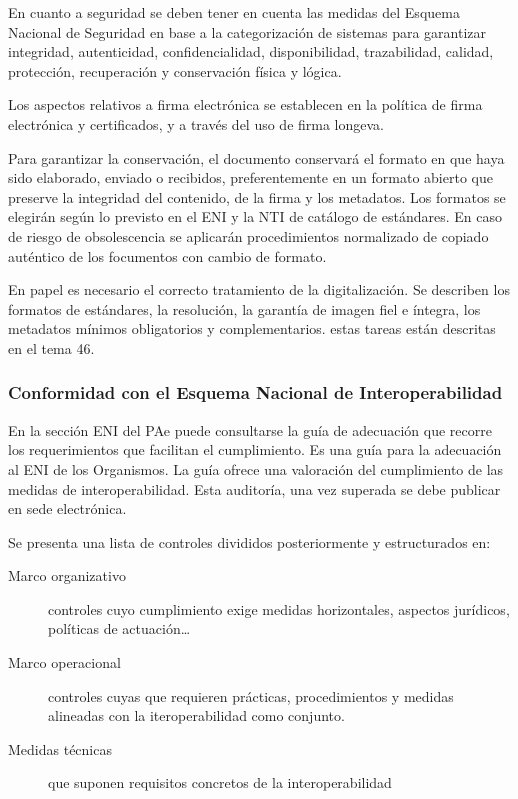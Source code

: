         En cuanto a seguridad se deben tener en cuenta las medidas del Esquema Nacional de Seguridad en base a la categorización de sistemas para garantizar integridad, autenticidad, confidencialidad, disponibilidad, trazabilidad, calidad, protección, recuperación y conservación física y lógica.

        Los aspectos relativos a firma electrónica se establecen en la política de firma electrónica y certificados, y a través del uso de firma longeva.

        Para garantizar la conservación, el documento conservará el formato en que haya sido elaborado, enviado o recibidos, preferentemente en un formato abierto que preserve la integridad del contenido, de la firma y los metadatos. Los formatos se elegirán según lo previsto en el ENI y la NTI de catálogo de estándares. En caso de riesgo de obsolescencia se aplicarán procedimientos normalizado de copiado auténtico de los focumentos con cambio de formato.

        En papel es necesario el correcto tratamiento de la digitalización. Se describen los formatos de estándares, la resolución, la garantía de imagen fiel e íntegra, los metadatos mínimos obligatorios y complementarios. estas tareas están descritas en el tema 46.

    \subsubsection{Conformidad con el Esquema Nacional de Interoperabilidad} %
    En la sección ENI del PAe puede consultarse la guía de adecuación que recorre los requerimientos que facilitan el cumplimiento. Es una guía para la adecuación al ENI de los Organismos. La guía ofrece una valoración del cumplimiento de las medidas de interoperabilidad. Esta auditoría, una vez superada se debe publicar en sede electrónica.

    Se presenta una lista de controles divididos posteriormente y estructurados en:
    \begin{description}
        \item[Marco organizativo] controles cuyo cumplimiento exige medidas horizontales, aspectos jurídicos, políticas de actuación\dots
        \item[Marco operacional] controles cuyas que requieren prácticas, procedimientos y medidas alineadas con la iteroperabilidad como conjunto.
        \item[Medidas técnicas] que suponen requisitos concretos de la interoperabilidad
    \end{description}

